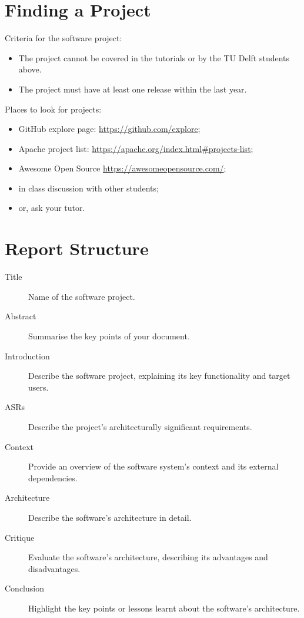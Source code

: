 \documentclass{csse4400}
\begin{document}
\section{Finding a Project}
Criteria for the software project:
\begin{itemize}
    \item The project cannot be covered in the tutorials or by the TU Delft students above.
    \item The project must have at least one release within the last year.
\end{itemize}

\noindent%
 Places to look for projects:
\begin{itemize}
    \item GitHub explore page: \url{https://github.com/explore};
    \item Apache project list: \url{https://apache.org/index.html#projects-list};
    \item Awesome Open Source \url{https://awesomeopensource.com/};
    \item in class discussion with other students;
    \item or, ask your tutor.
\end{itemize}


\section{Report Structure}

\begin{description}
    \item[Title] Name of the software project.
    \item[Abstract] Summarise the key points of your document.
    \item[Introduction] Describe the software project, explaining its key functionality and target users.
    \item[ASRs] Describe the project's architecturally significant requirements.
    \item[Context] Provide an overview of the software system's context and its external dependencies.
    \item[Architecture] Describe the software's architecture in detail.
    \item[Critique] Evaluate the software's architecture, describing its advantages and disadvantages.
    \item[Conclusion] Highlight the key points or lessons learnt about the software's architecture.
\end{description}
\end{document}
